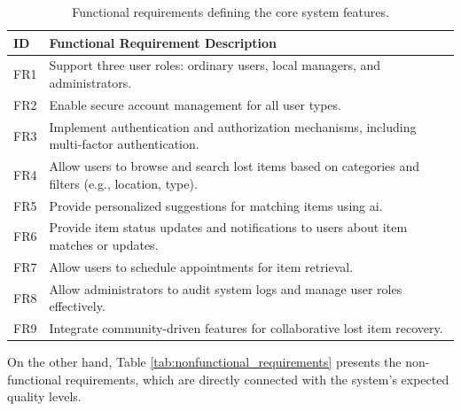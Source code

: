 \begin{table}[!htb]
\centering
\begin{tabular}{|p{}|p{}|}
\hline
\textbf{ID} & \textbf{Functional Requirement Description} \\ \hline
FR1 & Support three user roles: ordinary users, local managers, and administrators. \\ \hline
FR2 & Enable secure account management for all user types. \\ \hline
FR3 & Implement authentication and authorization mechanisms, including multi-factor authentication. \\ \hline
FR4 & Allow users to browse and search lost items based on categories and filters (e.g., location, type). \\ \hline
FR5 & Provide personalized suggestions for matching items using \ac{ai}. \\ \hline
FR6 & Provide item status updates and notifications to users about item matches or updates. \\ \hline
FR7 & Allow users to schedule appointments for item retrieval. \\ \hline
FR8 & Allow administrators to audit system logs and manage user roles effectively. \\ \hline
FR9 & Integrate community-driven features for collaborative lost item recovery. \\ \hline
\end{tabular}
\caption[Functional Requirements]{Functional requirements defining the core system features.}
\label{tab:functional_requirements}
\end{table}

On the other hand, Table \ref{tab:nonfunctional_requirements} presents the non-functional requirements, which are directly connected with the system's expected quality levels.

